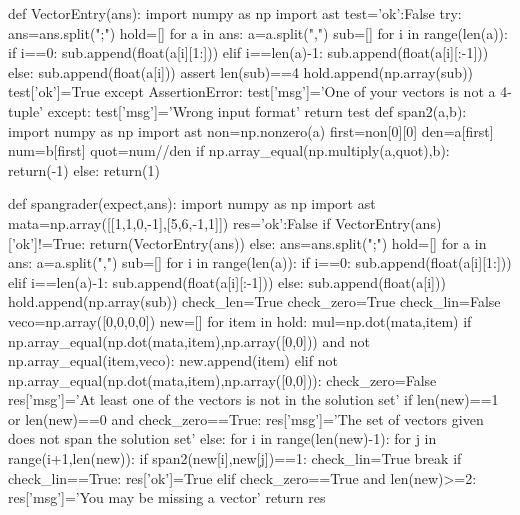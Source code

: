 
\begin{edXscript}

def VectorEntry(ans):
    import numpy as np
    import ast
    test={'ok':False}
    try:
        ans=ans.split(";")
        hold=[]
        for a in ans:
            a=a.split(",")
            sub=[]
            for i in range(len(a)):
                if i==0:
                    sub.append(float(a[i][1:]))
                elif i==len(a)-1:
                    sub.append(float(a[i][:-1]))
                else:
                    sub.append(float(a[i]))
            assert len(sub)==4
            hold.append(np.array(sub))
        test['ok']=True
    except AssertionError:
        test['msg']='One of your vectors is not a 4-tuple'
    except:
        test['msg']='Wrong input format'
    return test  
def span2(a,b):
    import numpy as np
    import ast
    non=np.nonzero(a)
    first=non[0][0]
    den=a[first]
    num=b[first]
    quot=num//den
    if np.array_equal(np.multiply(a,quot),b):
        return(-1)
    else:
        return(1)
        
def spangrader(expect,ans):
    import numpy as np
    import ast
    mata=np.array([[1,1,0,-1],[5,6,-1,1]])
    res={'ok':False}
    if VectorEntry(ans)['ok']!=True:
        return(VectorEntry(ans))
    else:
        ans=ans.split(";")
        hold=[]
        for a in ans:
            a=a.split(",")
            sub=[]
            for i in range(len(a)):
                if i==0:
                    sub.append(float(a[i][1:]))
                elif i==len(a)-1:
                    sub.append(float(a[i][:-1]))
                else:
                    sub.append(float(a[i]))
            hold.append(np.array(sub))
        check_len=True
        check_zero=True
        check_lin=False
        veco=np.array([0,0,0,0])
        new=[]
        for item in hold:
            mul=np.dot(mata,item)
            if np.array_equal(np.dot(mata,item),np.array([0,0])) and not np.array_equal(item,veco):
                new.append(item)
            elif not np.array_equal(np.dot(mata,item),np.array([0,0])):
                check_zero=False
                res['msg']='At least one of the vectors is not in the solution set'
        if len(new)==1 or len(new)==0 and check_zero==True:
            res['msg']='The set of vectors given does not span the solution set'
        else:
            for i in range(len(new)-1):
                for j in range(i+1,len(new)):
                    if span2(new[i],new[j])==1:
                        check_lin=True
                        break
            if check_lin==True:
                res['ok']=True
            elif check_zero==True and len(new)>=2:
                res['msg']='You may be missing a vector'
        return res

\end{edXscript}
